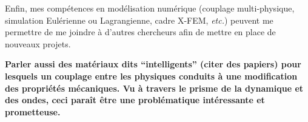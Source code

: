 Enfin, mes compétences en modélisation numérique (couplage multi-physique, simulation Eulérienne ou Lagrangienne, cadre X-FEM, \textit{etc.}) peuvent me permettre de me joindre à d'autres chercheurs afin de mettre en place de nouveaux projets.


\textbf{Parler aussi des matériaux dits ``intelligents'' (citer des papiers) pour lesquels un couplage entre les physiques conduits à une modification des propriétés mécaniques. Vu à travers le prisme de la dynamique et des ondes, ceci paraît être une problématique intéressante et prometteuse.}




